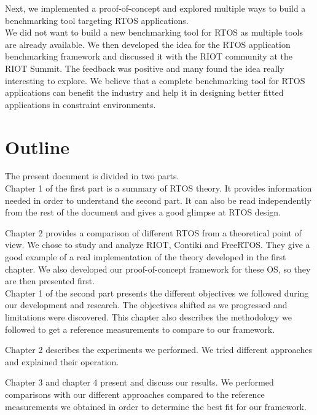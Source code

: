 Next, we implemented a proof-of-concept and explored multiple ways to build a benchmarking tool targeting RTOS applications.\\

We did not want to build a new benchmarking tool for RTOS as multiple tools are already available.
We then developed the idea for the RTOS application benchmarking framework and discussed it with the RIOT community at the RIOT Summit.
The feedback was positive and many found the idea really interesting to explore.
We believe that a complete benchmarking tool for RTOS applications can benefit the industry 
    and help it in designing better fitted applications in constraint environments.
%
%
\section*{Outline}
The present document is divided in two parts.\\

Chapter 1 of the first part is a summary of RTOS theory.
It provides information needed in order to understand the second part.
It can also be read independently from the rest of the document and gives a good glimpse at RTOS design.

Chapter 2 provides a comparison of different RTOS from a theoretical point of view.
We chose to study and analyze RIOT, Contiki and FreeRTOS.
They give a good example of a real implementation of the theory developed in the first chapter.
We also developed our proof-of-concept framework for these OS, so they are then presented first.\\

Chapter 1 of the second part presents the different objectives we followed during our development and research.
The objectives shifted as we progressed and limitations were discovered.
This chapter also describes the methodology we followed to get a reference measurements to compare to our framework.

Chapter 2 describes the experiments we performed.
We tried different approaches and explained their operation.

Chapter 3 and chapter 4 present and discuss our results.
We performed comparisons with our different approaches compared to the reference measurements we obtained in order to determine the best fit for our framework.